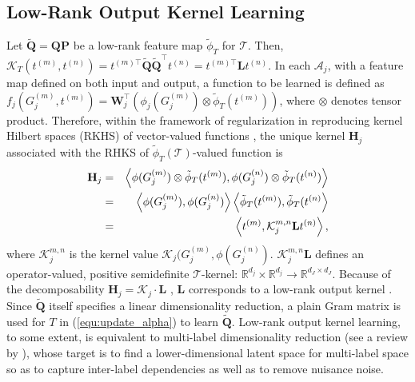 \documentclass[a4paper]{article}
\begin{document}
\subsection{Low-Rank Output Kernel Learning}
Let $\tilde{\mathbf{Q}}=\mathbf{QP}$ be a low-rank feature map $\tilde{\phi}_T$ for $\mathcal{T}$.
Then, $\mathcal{K}_T (t^{(m)}, t^{(n)})=t^{(m) \top} \tilde{\mathbf{Q}} 
\tilde{\mathbf{Q}}^\top t^{(n)}=t^{(m) \top} \mathbf{L} t^{(n)}$. In each $\mathcal{A}_j$, with a feature map defined on both input and output, a function to be 
learned is defined as $f_j(G_j^{(m)},t^{(m)})=\mathbf{W}_j^\top \left(\phi_j(G_j^{(m)})\otimes \tilde{\phi}_T(t^{(m)})\right)$, where $\otimes$ denotes tensor product. Therefore, within the framework 
of regularization in reproducing kernel Hilbert 
spaces (RKHS) of vector-valued functions \citep{vector_value_function},  the unique 
kernel $\mathbf{H}_j$ associated with the RHKS of $\tilde{\phi}_T(\mathcal{T})$-valued function is
\begin{eqnarray*}
    \small
        \mathbf{H}_j &=& \left\langle \phi(G_j^{(m)})\otimes \tilde{\phi}_T(t^{(m)}), \phi(G_j^{(n)})\otimes \tilde{\phi}_T(t^{(n)}) \right\rangle  \\
        &=& \left\langle \phi(G_j^{(m)}),\phi(G_j^{(n)}) \right\rangle \left\langle \tilde{\phi}_T(t^{(m)}),\tilde{\phi}_T(t^{(n)}\right\rangle \\ 
        &=& \left\langle t^{(m)}, \mathcal{K}_j^{m,n} \mathbf{L} t^{(n)} \right\rangle,
\end{eqnarray*}
where $\mathcal{K}_j^{m,n}$ is the kernel value $\mathcal{K}_j(G_j^{(m)},\phi(G_j^{(n)})$. $\mathcal{K}_j^{m,n} \mathbf{L}$ defines an operator-valued, 
positive semidefinite $\mathcal{T}$-kernel: $\mathbb{R}^{d_j}\times \mathbb{R}^{d_j}\to \mathbb{R}^{d_J \times d_J}$. 
Because of the decomposability $\mathbf{H}_j=\mathcal{K}_j\cdot \mathbf{L}$ \citep{output_kernel}, $\mathbf{L}$ corresponds to a low-rank output kernel \citep{low_rank_kernel}. 
Since $\tilde{\mathbf{Q}}$ itself specifies a linear dimensionality reduction, a
plain Gram matrix is used for $T$ in (\ref{equ:update_alpha}) to learn $\tilde{\mathbf{Q}}$.      
Low-rank output kernel learning, to some extent, is equivalent to multi-label dimensionality reduction (see a review by \citeauthor{sun_MLDR}\citeyear{sun_MLDR}),              
whose target is to find a lower-dimensional latent space for multi-label space so as to capture inter-label dependencies as well as to remove nuisance noise.             
\end{document}
